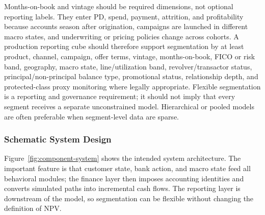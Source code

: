 \documentclass[11pt]{article}
\newcommand{\1}{\mathbf{1}}
\begin{document}
Months-on-book and vintage should be required dimensions, not optional
reporting labels. They enter PD, spend, payment, attrition, and profitability
because accounts season after origination, campaigns are launched in different
macro states, and underwriting or pricing policies change across cohorts. A
production reporting cube should therefore support segmentation by at least
product, channel, campaign, offer terms, vintage, months-on-book, FICO or risk
band, geography, macro state, line/utilization band, revolver/transactor
status, principal/non-principal balance type, promotional status, relationship
depth, and protected-class proxy monitoring where legally appropriate. Flexible
segmentation is a reporting and governance requirement; it should not imply
that every segment receives a separate unconstrained model. Hierarchical or
pooled models are often preferable when segment-level data are sparse.

\subsubsection{Schematic System Design}
\label{subsec:schematic}

Figure~\ref{fig:component-system} shows the intended system architecture. The
important feature is that customer state, bank action, and macro state feed all
behavioral modules; the finance layer then imposes accounting identities and
converts simulated paths into incremental cash flows. The reporting layer is
downstream of the model, so segmentation can be flexible without changing the
definition of NPV.
\end{document}
